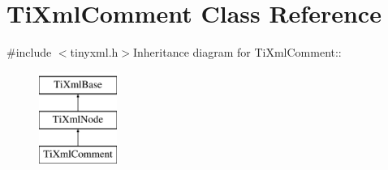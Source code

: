 \hypertarget{class_ti_xml_comment}{
\section{TiXmlComment Class Reference}
\label{class_ti_xml_comment}
}


{\ttfamily \#include $<$tinyxml.h$>$}Inheritance diagram for TiXmlComment::\begin{figure}[H]
\begin{center}
\leavevmode
\includegraphics[height=3cm]{class_ti_xml_comment}
\end{center}
\end{figure}
